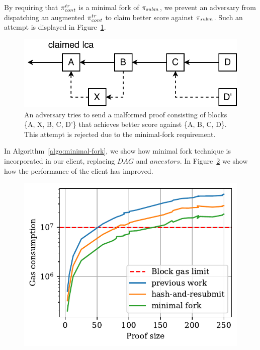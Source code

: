 By requiring that $\pi_{cont}^{tr}$ is a minimal fork of $\pi_{subm}$, we prevent an adversary
from dispatching an augmented $\pi_{cont}^{tr}$ to claim better score against $\pi_{subm}$.
Such an attempt is displayed in Figure~\ref{fig:adversary-minimal-fork}.

\begin{figure}[h]
    \begin{center}
        \includegraphics[width=0.78\columnwidth]{figures/adversary-minimal-fork.pdf}
    \end{center}

    \caption{An adversary tries to send a malformed proof consisting of blocks
    \{A, X, B, C, D'\} that achieves better score against \{A, B, C, D\}. This
    attempt is rejected due to the minimal-fork requirement.}

    \label{fig:adversary-minimal-fork}
\end{figure}

In Algorithm~\ref{algo:minimal-fork}, we show how minimal fork technique is
incorporated in our client, replacing $DAG$ and $ancestors$. In
Figure~\ref{fig:minimal-fork} we show how the performance of the client has
improved.



\begin{figure}[h]
    \begin{center}
        \includegraphics[width=1\columnwidth]{figures/minimal-fork.pdf}
    \end{center}
    \caption{}
    \label{fig:minimal-fork}
\end{figure}
